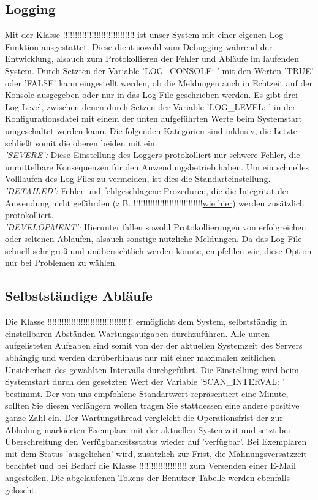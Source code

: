 \documentclass{article}
\begin{document}
\subsection{Logging}
Mit der Klasse !!!!!!!!!!!!!!!!!!!!!!!!!!!!!!\hyperlink{}{} ist unser System mit einer eigenen Log-Funktion ausgestattet. Diese dient sowohl zum Debugging während der Entwicklung, alsauch zum Protokollieren der Fehler und Abläufe im laufenden System. Durch Setzten der Variable 'LOG\_CONSOLE: ' mit den Werten 'TRUE' oder 'FALSE' kann eingestellt werden, ob die Meldungen auch in Echtzeit auf der Konsole ausgegeben oder nur in das Log-File geschrieben werden. Es gibt drei Log-Level, zwischen denen durch Setzen der Variable 'LOG\_LEVEL: ' in der Konfigurationsdatei mit einem der unten aufgeführten Werte beim Systemstart umgeschaltet werden kann. Die folgenden Kategorien sind inklusiv, die Letzte schließt somit die oberen beiden mit ein. \\
\textit{'SEVERE':} Diese Einstellung des Loggers protokolliert nur schwere Fehler, die unmittelbare Konsequenzen für den Anwendungsbetrieb haben. Um ein schnelles Volllaufen des Log-Files zu vermeiden, ist dies die Standarteinstellung.\\
\textit{'DETAILED':} Fehler und fehlgeschlagene Prozeduren, die die Integrität der Anwendung nicht gefährden (z.B. !!!!!!!!!!!!!!!!!!!!!!!!!!!!!\hyperlink{}{wie hier}) werden zusätzlich protokolliert.\\
\textit{'DEVELOPMENT':} Hierunter fallen sowohl Protokollierungen von erfolgreichen oder seltenen Abläufen, alsauch sonstige nützliche Meldungen. Da das Log-File schnell sehr groß und unübersichtlich werden könnte, empfehlen wir, diese Option nur bei Problemen zu wählen.\\
\subsection{Selbstständige Abläufe}
Die Klasse !!!!!!!!!!!!!!!!!!!!!!!!!!!!!!!!!!!!\hyperlink{}{} ermöglicht dem System, selbstständig in einstellbaren Abständen Wartungsaufgaben durchzuführen. Alle unten aufgelisteten Aufgaben sind somit von der der aktuellen Systemzeit des Servers abhängig und werden darüberhinaus nur mit einer maximalen zeitlichen Unsicherheit des gewählten Intervalls durchgeführt. Die Einstellung wird beim Systemstart durch den gesetzten Wert der Variable 'SCAN\_INTERVAL: ' bestimmt. Der von uns empfohlene Standartwert repräsentiert eine Minute, sollten Sie diesen verlängern wollen tragen Sie stattdessen eine andere positive ganze Zahl ein. Der Wartungsthread vergleicht die Operationsfrist der zur Abholung markierten Exemplare mit der aktuellen Systemzeit und setzt bei Überschreitung den Verfügbarkeitsstatus wieder auf 'verfügbar'. Bei Exemplaren mit dem Status 'ausgeliehen' wird, zusätzlich zur Frist, die Mahnungsversatzzeit beachtet und bei Bedarf die Klasse !!!!!!!!!!!!!!!!!!!!\hyperlink{}{} zum Versenden einer E-Mail angestoßen. Die abgelaufenen Tokens der Benutzer-Tabelle werden ebenfalls gelöscht.
\end{document}
